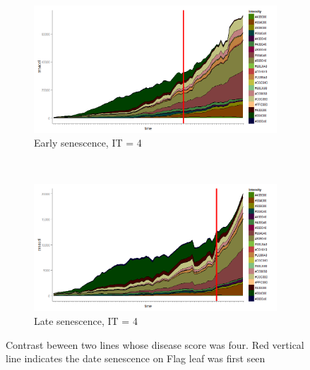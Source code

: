 \documentclass{frontiersSCNS} %
\begin{document}
\begin{figure}
    \begin{center}
    \begin{subfigure}[b]{0.5\textwidth}
        \includegraphics[width=\textwidth]{fig2a.png}
        \caption{Early senescence, IT = 4}
    \end{subfigure}
    ~ %
    \begin{subfigure}[b]{0.5\textwidth}
        \includegraphics[width=\textwidth]{fig2b.png}
        \caption{Late senescence, IT = 4}
    \end{subfigure}
\end{center}
    \caption{Contrast beween two lines whose disease score was four. Red vertical line indicates the date senescence on Flag leaf was first seen}\label{fig3}
\end{figure}
\end{document}
